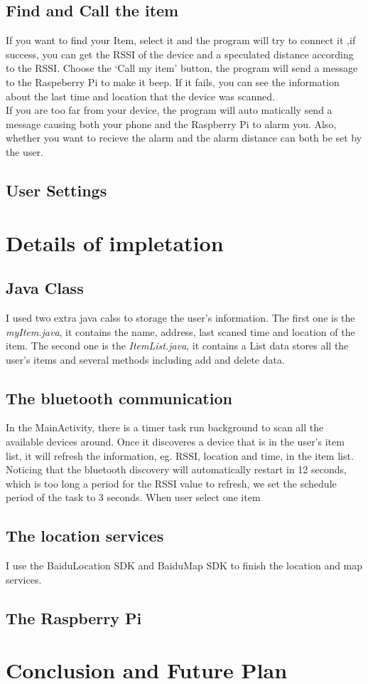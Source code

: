 \documentclass{article}
\begin{document}
\subsection{Find and Call the item}
If you want to find your Item, select it and the program will try to connect it ,if success, you can get the RSSI of the device and a speculated distance according to the RSSI. Choose the `Call my item' button, the program will send a message to the Raspeberry Pi to make it beep. If it fails, you can see the information about the last time and location that the device was scanned. \\
If you are too far from your device, the program will auto matically send a message causing both your phone and the Raspberry Pi  to alarm you. Also, whether you want to recieve the alarm and the alarm distance can both be set by the user.
\subsection{User Settings}

\section{Details of impletation}
\subsection{Java Class}
I used two extra java calss to storage the user's information. The first one is the \emph{myItem.java}, it contains the name, address, last scaned time and location of the item. The second one is the \emph{ItemList.java}, it contains a List data stores all the user's items and several methods including add and delete data.
\subsection{The bluetooth communication}
In the MainActivity, there is a timer task run background to scan all the available devices around. Once it discoveres a device that is in the user's item list, it will refresh the information, eg. RSSI, location and time, in the item list. Noticing that the bluetooth discovery will automatically restart in 12 seconds, which is too long a period for the RSSI value to refresh, we set the schedule period of the task to 3 seconds. When user select one item 
\subsection{The location services}
I use the BaiduLocation SDK and BaiduMap SDK to finish the location and map services.
\subsection{The Raspberry Pi}

\section{Conclusion and Future Plan}
\end{document}
